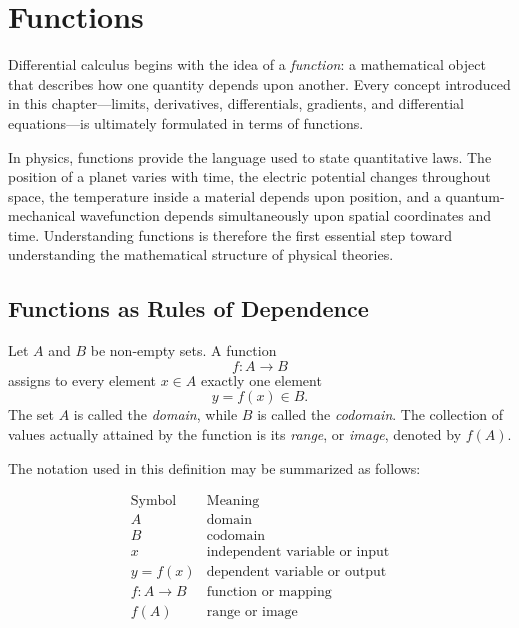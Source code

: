 \section{Functions}
\label{sec:functions}

Differential calculus begins with the idea of a \emph{function}: a mathematical object that describes how one quantity depends upon another. Every concept introduced in this chapter---limits, derivatives, differentials, gradients, and differential equations---is ultimately formulated in terms of functions.

In physics, functions provide the language used to state quantitative laws. The position of a planet varies with time, the electric potential changes throughout space, the temperature inside a material depends upon position, and a quantum-mechanical wavefunction depends simultaneously upon spatial coordinates and time. Understanding functions is therefore the first essential step toward understanding the mathematical structure of physical theories.

\subsection{Functions as Rules of Dependence}

\begin{bookdefinition}[Function]
Let \(A\) and \(B\) be non-empty sets. A function
\[
f:A\longrightarrow B
\]
assigns to every element \(x\in A\) exactly one element
\[
y=f(x)\in B.
\]
The set \(A\) is called the \emph{domain}, while \(B\) is called the \emph{codomain}. The collection of values actually attained by the function is its \emph{range}, or \emph{image}, denoted by \(f(A)\).
\end{bookdefinition}

The notation used in this definition may be summarized as follows:

\[
\begin{array}{c|l}
\text{Symbol} & \text{Meaning} \\
\hline
A & \text{domain} \\
B & \text{codomain} \\
x & \text{independent variable or input} \\
y=f(x) & \text{dependent variable or output} \\
f:A\to B & \text{function or mapping} \\
f(A) & \text{range or image}
\end{array}
\]

